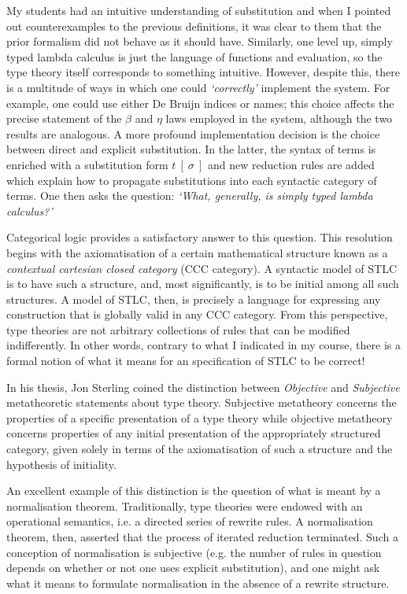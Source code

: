 \documentclass{article}[9pt]
\begin{document}
My students had an intuitive understanding of substitution and when I pointed
out counterexamples to the previous definitions, it was clear to them that the
prior formalism did not behave as it should have. Similarly, one level up,
simply typed lambda calculus is just the language of functions and evaluation,
so the type theory itself corresponds to something intuitive. However, despite
this, there is a multitude of ways in which one could \emph{`correctly'}
implement the system. For example, one could use either De Bruijn indices or
names; this choice affects the precise statement of the $\beta$ and $\eta$ laws
employed in the system, although the two results are analogous. A more profound
implementation decision is the choice between direct and explicit substitution.
In the latter, the syntax of terms is enriched with a substitution form
$t~[~\sigma~]$ and new reduction rules are added which explain how to propagate
substitutions into each syntactic category of terms. One then asks the question:
\emph{`What, generally, is simply typed lambda calculus?'}

Categorical logic provides a satisfactory answer to this question. This
resolution begins with the axiomatisation of a certain mathematical structure
known as a \emph{contextual cartesian closed category} (CCC category). A
syntactic model of STLC is to have such a structure, and, most significantly, is
to be initial among all such structures. A model of STLC, then, is precisely a
language for expressing any construction that is globally valid in any CCC
category. From this perspective, type theories are not arbitrary collections of
rules that can be modified indifferently. In other words, contrary to what I
indicated in my course, there is a formal notion of what it means for an
specification of STLC to be correct!

In his thesis, Jon Sterling coined the distinction between \emph{Objective} and
\emph{Subjective} metatheoretic statements about type theory. Subjective
metatheory concerns the properties of a specific presentation of a type theory
while objective metatheory concerns properties of any initial presentation of
the appropriately structured category, given solely in terms of the
axiomatisation of such a structure and the hypothesis of initiality.

An excellent example of this distinction is the question of what is meant by a
normalisation theorem. Traditionally, type theories were endowed with an
operational semantics, i.e. a directed series of rewrite rules. A normalisation
theorem, then, asserted that the process of iterated reduction terminated. Such
a conception of normalisation is subjective (e.g. the number of rules in
question depends on whether or not one uses explicit substitution), and one
might ask what it means to formulate normalisation in the absence of a rewrite
structure.
\end{document}
